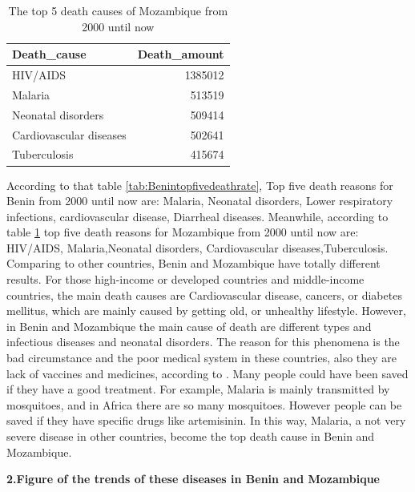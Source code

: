 \documentclass[11pt,a4paper,]{article}
\begin{document}
\begin{table}

\caption{\label{tab:Mozambiquetopfivedeathrate}The top 5 death causes of Mozambique from 2000 until now}
\centering
\begin{tabular}[t]{l|r}
\hline
Death\_cause & Death\_amount\\
\hline
HIV/AIDS & 1385012\\
\hline
Malaria & 513519\\
\hline
Neonatal disorders & 509414\\
\hline
Cardiovascular diseases & 502641\\
\hline
Tuberculosis & 415674\\
\hline
\end{tabular}
\end{table}

According to that table \ref{tab:Benintopfivedeathrate}, Top five death reasons for Benin from 2000 until now are: Malaria, Neonatal disorders, Lower respiratory infections, cardiovascular disease, Diarrheal diseases. Meanwhile, according to table \ref{tab:Mozambiquetopfivedeathrate} top five death reasons for Mozambique from 2000 until now are: HIV/AIDS, Malaria,Neonatal disorders, Cardiovascular diseases,Tuberculosis. Comparing to other countries, Benin and Mozambique have totally different results. For those high-income or developed countries and middle-income countries, the main death causes are Cardiovascular disease, cancers, or diabetes mellitus, which are mainly caused by getting old, or unhealthy lifestyle. However, in Benin and Mozambique the main cause of death are different types and infectious diseases and neonatal disorders. The reason for this phenomena is the bad circumstance and the poor medical system in these countries, also they are lack of vaccines and medicines, according to \textcite{mbaye2019telling}. Many people could have been saved if they have a good treatment. For example, Malaria is mainly transmitted by mosquitoes, and in Africa there are so many mosquitoes. However people can be saved if they have specific drugs like artemisinin. In this way, Malaria, a not very severe disease in other countries, become the top death cause in Benin and Mozambique.

\textbf{2.Figure of the trends of these diseases in Benin and Mozambique}
\end{document}
